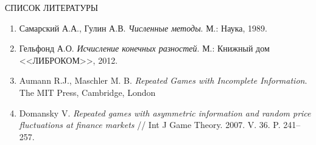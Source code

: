 \begin{center}
СПИСОК ЛИТЕРАТУРЫ
\end{center}

\begin{enumerate}
\item
Самарский А.А., Гулин А.В. \textit{Численные методы}. М.: Наука, 1989.

\item
Гельфонд А.О. \textit{Исчисление конечных разностей}. М.: Книжный дом <<ЛИБРОКОМ>>, 2012.

\item
Aumann R.J., Maschler M. B. \textit{Repeated Games with Incomplete Information}. The MIT Press, Cambridge, London

\item
Domansky V. \textit{Repeated games with asymmetric information and random price fluctuations at finance markets} // Int J Game Theory. 2007. V. 36. P. 241--257.
\end{enumerate}
